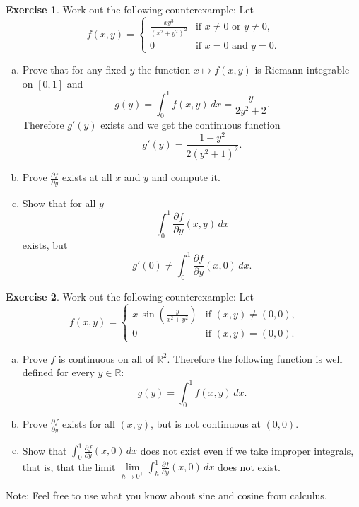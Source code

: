 \documentclass[12pt,openany]{book}
\newcommand{\R}{{\mathbb{R}}}
\theoremstyle{plain}
\theoremstyle{remark}
\theoremstyle{definition}
\newenvironment{exbox}{%
    \def\FrameCommand{\vrule width 1pt \relax\hspace {10pt}}%
    \MakeFramed {\advance \hsize -\width \FrameRestore }%
}{%
    \endMakeFramed
}
\newenvironment{exparts}{%
    \leavevmode\begin{enumerate}[a),noitemsep,topsep=0pt,parsep=0pt,partopsep=0pt]
}{%
    \end{enumerate}
}
\theoremstyle{exercise}
\newtheorem{exercise}{Exercise}[section]
\theoremstyle{example}
\begin{document}
\begin{exbox}
\begin{exercise}
Work out the following counterexample:  Let
\begin{equation*}
f(x,y) =
\begin{cases}
\frac{xy^3}{{(x^2+y^2)}^2} & \text{if $x\not=0$ or $y\not= 0$,}\\
0 & \text{if $x=0$ and $y=0$.}
\end{cases}
\end{equation*}
\begin{exparts}
\item
Prove that for any fixed $y$ the function $x \mapsto f(x,y)$ is
Riemann integrable on $[0,1]$ and
\begin{equation*}
g(y) = \int_0^1 f(x,y) \, dx = \frac{y}{2y^2+2} .
\end{equation*}
Therefore $g'(y)$ exists and we get the continuous function
\begin{equation*}
g'(y) = \frac{1-y^2}{2{(y^2+1)}^2} .
\end{equation*}
\item
Prove $\frac{\partial f}{\partial y}$ exists at all $x$ and $y$ and
compute it.
\item
Show that for all $y$
\begin{equation*}
\int_0^1 \frac{\partial f}{\partial y} (x,y) \, dx
\end{equation*}
exists, but
\begin{equation*}
g'(0) \not= \int_0^1 \frac{\partial f}{\partial y} (x,0) \, dx .
\end{equation*}
\end{exparts}
\end{exercise}

\pagebreak[2]
\begin{exercise}
Work out the following counterexample:  Let
\begin{equation*}
f(x,y) =
\begin{cases}
x \,\sin \left(\frac{y}{x^2+y^2}\right) & \text{if $(x,y) \not= (0,0)$,}\\
0 & \text{if $(x,y)=(0,0)$.}
\end{cases}
\end{equation*}
\begin{exparts}
\item
Prove $f$ is continuous on all of $\R^2$.
Therefore the following function is well defined for every $y \in \R$:
\begin{equation*}
g(y) = \int_0^1 f(x,y) \, dx .
\end{equation*}
\item
Prove $\frac{\partial f}{\partial y}$ exists for all $(x,y)$,
but is not continuous at $(0,0)$.
\item
Show that $\int_0^1 \frac{\partial f}{\partial y}(x,0) \, dx$ does not
exist even if we take improper integrals, that is,
that the limit
$\lim\limits_{h \to 0^+} \int_h^1 \frac{\partial f}{\partial y}(x,0) \, dx$
does not exist.
\end{exparts}
Note: Feel free to use what you know about sine and cosine from calculus.
\end{exercise}


\end{exbox}
\end{document}
